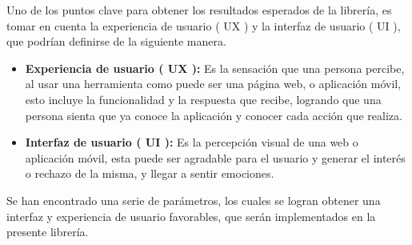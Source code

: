 Uno de los puntos clave para obtener los resultados esperados de la librería, es tomar en cuenta la experiencia de usuario ( UX ) y la interfaz de usuario ( UI ), que podrían definirse de la siguiente manera.

\begin{itemize}
\item \textbf{Experiencia de usuario ( UX ): } Es la sensación que una persona percibe, al usar una herramienta como puede ser una página web, o aplicación móvil, esto incluye la funcionalidad y la respuesta que recibe, logrando que una persona sienta que ya conoce la aplicación y conocer cada acción que realiza.
\item \textbf{Interfaz de usuario ( UI ):  } Es la percepción visual de una web o aplicación móvil, esta puede ser agradable para el usuario y generar el interés o rechazo de la misma, y llegar a sentir emociones.
\end{itemize}

Se han encontrado una serie de parámetros, los cuales se logran obtener una interfaz y experiencia de usuario favorables, que serán implementados en la presente librería.

